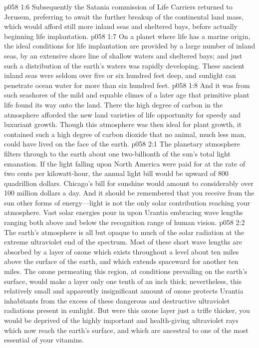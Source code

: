 \vs p058 1:6 Subsequently the Satania commission of Life Carriers returned to Jerusem, preferring to await the further breakup of the continental land mass, which would afford still more inland seas and sheltered bays, before actually beginning life implantation.
\pc \vs p058 1:7 On a planet where life has a marine origin, the ideal conditions for life implantation are provided by a large number of inland seas, by an extensive shore line of shallow waters and sheltered bays; and just such a distribution of the earth’s waters was rapidly developing. These ancient inland seas were seldom over five or six hundred feet deep, and sunlight can penetrate ocean water for more than six hundred feet.
\vs p058 1:8 And it was from such seashores of the mild and equable climes of a later age that primitive plant life found its way onto the land. There the high degree of carbon in the atmosphere afforded the new land varieties of life opportunity for speedy and luxuriant growth. Though this atmosphere was then ideal for plant growth, it contained such a high degree of carbon dioxide that no animal, much less man, could have lived on the face of the earth.\plusone
{}
\vs p058 2:1 The planetary atmosphere filters through to the earth about one two\hyp{}billionth of the sun’s total light emanation. If the light falling upon North America were paid for at the rate of two cents per kilowatt\hyp{}hour, the annual light bill would be upward of 800 quadrillion dollars. Chicago’s bill for sunshine would amount to considerably over 100 million dollars a day. And it should be remembered that you receive from the sun other forms of energy---light is not the only solar contribution reaching your atmosphere. Vast solar energies pour in upon Urantia embracing wave lengths ranging both above and below the recognition range of human vision.
\pc \vs p058 2:2 The earth’s atmosphere is all but opaque to much of the solar radiation at the extreme ultraviolet end of the spectrum. Most of these short wave lengths are absorbed by a layer of ozone which exists throughout a level about ten miles above the surface of the earth, and which extends spaceward for another ten miles. The ozone permeating this region, at conditions prevailing on the earth’s surface, would make a layer only one tenth of an inch thick; nevertheless, this relatively small and apparently insignificant amount of ozone protects Urantia inhabitants from the excess of these dangerous and destructive ultraviolet radiations present in sunlight. But were this ozone layer just a trifle thicker, you would be deprived of the highly important and health\hyp{}giving ultraviolet rays which now reach the earth’s surface, and which are ancestral to one of the most essential of your vitamins.
